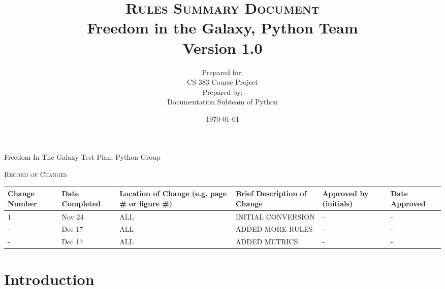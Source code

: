 \documentclass[a4wide]{article}
\begin{document}
\title{\textsc{Rules Summary Document}
  \\ Freedom in the Galaxy, Python Team
  \vspace{10 mm}
  \\ Version 1.0
  \vspace{10 mm}}
  
\date{\today}

\author{Prepared for:
  \\ CS 383 Course Project
  \vspace{10 mm}
  \\Prepared by:
  \\ Documentation Subteam of Python 
  \vspace{10 mm}}
  
\maketitle
\newpage
  
\begin{center}
\noindent Freedom In The Galaxy Test Plan, Python Group

\vspace{10 mm}

\noindent \textsc{Record of Changes}   

\vspace{10 mm}


\begin{tabularx}{\textwidth}{| X | X | X | X | X | X |}
  \hline
  \textbf{Change Number} &
    \textbf{Date Completed} &
    \textbf{Location of Change (e.g. page \# or figure \#)} &
    \textbf{Brief Description of Change} &
    \textbf{Approved by (initials)} &
    \textbf{Date Approved} 
    \\ \hline 1 & Nov 24 & ALL  & INITIAL CONVERSION & - & -
    \\ \hline - & Dec 17 & ALL & ADDED MORE RULES & - & -
    \\ \hline - & Dec 17 & ALL & ADDED METRICS & - & -
    \\ \hline
\end{tabularx}
\end{center}
\newpage 
\tableofcontents
\newpage

\section{Introduction}
\end{document}
